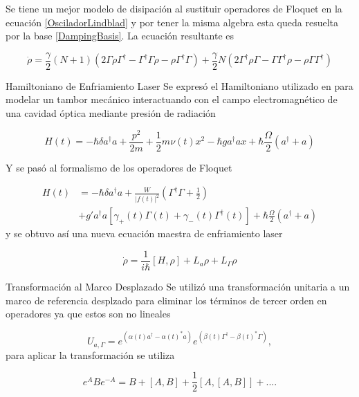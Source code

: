 \documentclass[11pt]{beamer}
\begin{document}
\begin{frame}
Se tiene un mejor modelo de disipación al sustituir operadores de Floquet en la ecuación \eqref{OsciladorLindblad} y por tener la misma algebra esta queda resuelta por la base \eqref{DampingBasis}. La ecuación resultante es

\begin{equation} \label{GammaLindblat}
\dot{\rho}=\frac{\gamma}{2}(N+1)(2\Gamma\rho\Gamma^\dagger - \Gamma^\dagger\Gamma \rho - \rho \Gamma^\dagger \Gamma )
 + \frac{\gamma}{2}N(2\Gamma^\dagger \rho \Gamma - \Gamma \Gamma^\dagger \rho - \rho \Gamma\Gamma^\dagger)
\end{equation}
\end{frame}

\begin{frame}{Hamiltoniano de Enfriamiento Laser}
Se expresó el Hamiltoniano utilizado en \cite{BarberisLC} para modelar un tambor mecánico interactuando con el campo electromagnético de una cavidad óptica mediante presión de radiación

\begin{equation}
H(t) = -\hbar \delta a^\dagger a + \frac{p^2}{2m} + \frac{1}{2}m \nu (t) x^2 -\hbar g a^\dagger a x + \hbar\frac{\Omega}{2}(a^\dagger + a)
\end{equation}

Y se pasó al formalismo de los operadores de Floquet

\end{frame}

\begin{frame}
\begin{align}
H(t) &= \nonumber -\hbar \delta a^\dagger a + \frac{W}{|f(t)|^2}(\Gamma^\dagger \Gamma + \frac{1}{2}) \\
&+  g'a^\dagger a[\gamma_+(t)\Gamma (t) +\gamma_-(t)\Gamma^\dagger (t)] + \hbar\frac{\Omega}{2}(a^\dagger + a)
\end{align} y se obtuvo así una nueva ecuación maestra de enfriamiento laser

\begin{equation}
\dot{\rho} = \frac{1}{i\hbar}[H,\rho] + L_a\rho + L_\Gamma \rho
\end{equation}
\end{frame}

\begin{frame}{Transformación al Marco Desplazado}
Se utilizó una transformación unitaria a un marco de referencia desplzado para eliminar los términos de tercer orden en operadores ya que estos son no lineales

\begin{equation}
U_{a,\Gamma} = e^{(\alpha(t) a^\dagger - \alpha(t)^*a)}e^{(\beta(t) \Gamma^\dagger - \beta(t)^*\Gamma)},
\end{equation} para aplicar la transformación se utiliza

\begin{equation}
e^{A} B e^{-A} = B + [A,B] + \frac{1}{2}[A,[A,B]] + ... .
\end{equation}
\end{frame}
\end{document}
